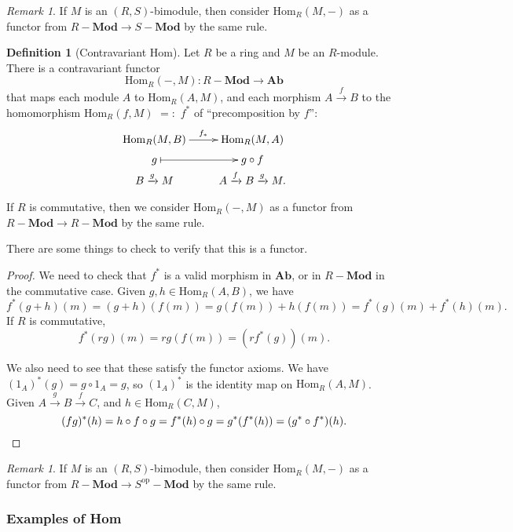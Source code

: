\documentclass{amsart}[12pt]
\newcommand{\Hom}{\mathrm{Hom}}
\newcommand{\Def}[1]{#1 \index{#1}}
\numberwithin{equation}{section}
\theoremstyle{plain} %
\theoremstyle{definition}
\newtheorem{defn}[equation]{Definition}
\theoremstyle{remark}
\newtheorem{rem}[equation]{Remark}
\newcommand{\sssec}[1]{\subsubsection{#1}}
\newcommand{\xra}[1]{\xrightarrow{#1}}
\newcommand{\Ab}{\mathbf{Ab}}
\newcommand{\Mod}[1]{#1-\mathbf{Mod}}
\begin{document}
\begin{rem}If $M$ is an $(R,S)$-bimodule, then consider $\Hom_R(M,-)$ as a functor from $ \Mod{R} \to \Mod{S}$ by the same rule.\end{rem}

\begin{defn}[Contravariant Hom] Let $R$ be a ring and $M$ be an $R$-module. There is a contravariant functor \index{$\Hom_R(-,M)$}
\[ \Hom_R(-,M) : \Mod{R} \to \Ab\]
that maps each module $A$ to  $\Hom_R(A,M)$, and each morphism $A\xra{f} B$ to the homomorphism {\Def{$\Hom_{R}(f,M)$}  $=:$ \Def{$f^*$}} of ``precomposition by $f$'':
		$$\xymatrix@R=1mm{\Hom_{R}(M,B) \ar[r]^{f_*} & \Hom_{R}(M,A) \\g \ar@{|->}[r] &  g\circ f
		\\ B \xrightarrow{g}M & A \xrightarrow{f} B \xrightarrow{g} M.  }$$
		
	If $R$ is commutative, then we consider $\Hom_R(-,M)$ as a functor from $ \Mod{R} \to \Mod{R}$ by the same rule.
\end{defn}
There are some things to check to verify that this is a functor.
\begin{proof}
We need to check that $f^*$ is a valid morphism in $\Ab$, or in $\Mod{R}$ in the commutative case.
Given $g,h\in \Hom_{R}(A,B)$, we have \[f^*(g+h)(m)=(g+h)(f(m)) = g(f(m)) + h(f(m)) = f^*(g)(m) + f^*(h)(m).\]
If $R$ is commutative,
\[ f^*(rg)(m) = rg(f(m)) = (r f^*(g))(m).\]

We also need to see that these satisfy the functor axioms. We have $(1_A)^*(g) = g \circ 1_A = g$, so $(1_A)^*$ is the identity map on $\Hom_R(A,M)$. Given $A\xra{g}B\xra{f} C$, and $h\in \Hom_R(C,M)$, \[(fg)^* (h) =h\circ  f\circ g = f^*(h) \circ g = g^*(f^*(h)) = (g^* \circ f^*)(h).\qedhere\]
\end{proof}
\begin{rem}If $M$ is an $(R,S)$-bimodule, then consider $\Hom_R(M,-)$ as a functor from $ \Mod{R} \to \Mod{S^{\mathrm{op}}}$ by the same rule.
\end{rem}

\sssec{Examples of Hom}
\end{document}
